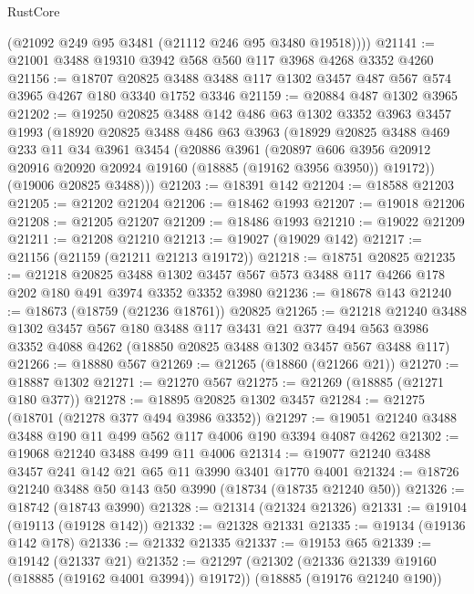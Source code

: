 \begin{lexlean}{RustCore}
\begin{coremodule}
        (@21092 @249 @95 @3481 (@21112 @246 @95 @3480 @19518))))
@21141 := @21001 @3488 @19310 @3942 @568 @560 @117 @3968 @4268 @3352 @4260
@21156 := @18707
    @20825
    @3488
    @3488
    @117
    @1302
    @3457
    @487
    @567
    @574
    @3965
    @4267
    @180
    @3340
    @1752
    @3346
@21159 := @20884 @487 @1302 @3965
@21202 := @19250
    @20825
    @3488
    @142
    @486
    @63
    @1302
    @3352
    @3963
    @3457
    @1993
    (@18920
      @20825
      @3488
      @486
      @63
      @3963
      (@18929
        @20825
        @3488
        @469
        @233
        @11
        @34
        @3961
        @3454
        (@20886
          @3961
          (@20897
            @606
            @3956
            @20912
            @20916
            @20920
            @20924
            @19160
            (@18885 (@19162 @3956 @3950))
            @19172))
        (@19006 @20825 @3488)))
@21203 := @18391 @142
@21204 := @18588 @21203
@21205 := @21202 @21204
@21206 := @18462 @1993
@21207 := @19018 @21206
@21208 := @21205 @21207
@21209 := @18486 @1993
@21210 := @19022 @21209
@21211 := @21208 @21210
@21213 := @19027 (@19029 @142)
@21217 := @21156 (@21159 (@21211 @21213 @19172))
@21218 := @18751 @20825
@21235 := @21218
    @20825
    @3488
    @1302
    @3457
    @567
    @573
    @3488
    @117
    @4266
    @178
    @202
    @180
    @491
    @3974
    @3352
    @3352
    @3980
@21236 := @18678 @143
@21240 := @18673 (@18759 (@21236 @18761)) @20825
@21265 := @21218
    @21240
    @3488
    @1302
    @3457
    @567
    @180
    @3488
    @117
    @3431
    @21
    @377
    @494
    @563
    @3986
    @3352
    @4088
    @4262
    (@18850 @20825 @3488 @1302 @3457 @567 @3488 @117)
@21266 := @18880 @567
@21269 := @21265 (@18860 (@21266 @21))
@21270 := @18887 @1302
@21271 := @21270 @567
@21275 := @21269 (@18885 (@21271 @180 @377))
@21278 := @18895 @20825 @1302 @3457
@21284 := @21275 (@18701 (@21278 @377 @494 @3986 @3352))
@21297 := @19051 @21240 @3488 @3488 @190 @11 @499 @562 @117 @4006 @190 @3394 @4087 @4262
@21302 := @19068 @21240 @3488 @499 @11 @4006
@21314 := @19077 @21240 @3488 @3457 @241 @142 @21 @65 @11 @3990 @3401 @1770 @4001
@21324 := @18726 @21240 @3488 @50 @143 @50 @3990 (@18734 (@18735 @21240 @50))
@21326 := @18742 (@18743 @3990)
@21328 := @21314 (@21324 @21326)
@21331 := @19104 (@19113 (@19128 @142))
@21332 := @21328 @21331
@21335 := @19134 (@19136 @142 @178)
@21336 := @21332 @21335
@21337 := @19153 @65
@21339 := @19142 (@21337 @21)
@21352 := @21297
    (@21302 (@21336 @21339 @19160 (@18885 (@19162 @4001 @3994)) @19172))
    (@18885 (@19176 @21240 @190))

\end{coremodule}
\end{lexlean}
